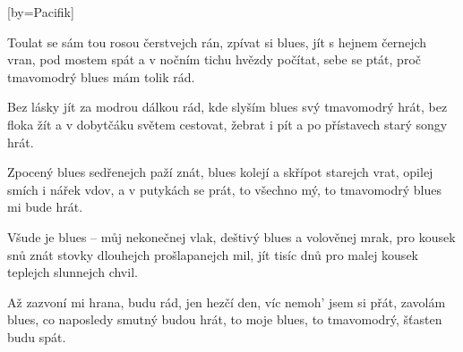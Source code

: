 [by={Pacifik}]

\beginverse{}
Toulat se sám tou rosou čerstvejch rán,
zpívat si blues, jít s hejnem černejch vran,
pod mostem spát a v nočním tichu hvězdy počítat,
sebe se ptát, proč tmavomodrý blues mám tolik rád.
\endverse{}

\beginverse{}
Bez lásky jít za modrou dálkou rád,
kde slyším blues svý tmavomodrý hrát,
bez floka žít a v dobytčáku světem cestovat,
žebrat i pít a po přístavech starý songy hrát.
\endverse{}

\beginverse{}
Zpocený blues sedřenejch paží znát,
blues kolejí a skřípot starejch vrat,
opilej smích i nářek vdov, a v putykách se prát,
to všechno mý, to tmavomodrý blues mi bude hrát.
\endverse{}

\beginverse{}
Všude je blues -- můj nekonečnej vlak,
deštivý blues a volověnej mrak,
pro kousek snů znát stovky dlouhejch prošlapanejch mil,
jít tisíc dnů pro malej kousek teplejch slunnejch chvil.
\endverse{}

\beginverse{}
Až zazvoní mi hrana, budu rád,
jen hezčí den, víc nemoh' jsem si přát,
zavolám blues, co naposledy smutný budou hrát,
to moje blues, to tmavomodrý, šťasten budu spát.
\endverse{}

\endsong{}
